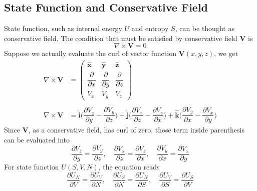 \documentclass[../../../main.tex]{subfiles}
\begin{document}
\subsection{State Function and Conservative Field}
State function, such as internal energy \(U \) and entropy \(S \), can be thought as conservative field. The condition that must be satisfied by conservative field $\mathbf{V}$ is
\begin{equation*}
    \nabla\times \mathbf{V}=0
\end{equation*}
Suppose we actually evaluate the curl of vector function $\mathbf{V}(x,y,z)$, we get
\begin{align*}
    \nabla\times \mathbf{V} & =\begin{pmatrix}
                                   \mathbf{\hat{x}}              & \mathbf{\hat{y}}              & \mathbf{\hat{z}}              \\
                                   \dfrac{\partial }{\partial x} & \dfrac{\partial }{\partial y} & \dfrac{\partial }{\partial z} \\
                                   V_x                           & V_y                           & V_z
                               \end{pmatrix} \\
    \\
    \nabla\times \mathbf{V} & =
    \mathbf{\hat{i}} \biggl(\dfrac{\partial V_z}{\partial y} -\dfrac{\partial V_y}{\partial z}\biggr)+
    \mathbf{\hat{j}} \biggl(\dfrac{\partial V_x}{\partial z}-\dfrac{\partial V_z}{\partial x} \biggr) +
    \mathbf{\hat{k}}\biggl( \dfrac{\partial V_y}{\partial x}-\dfrac{\partial V_x}{\partial y}\biggr)
\end{align*}
Since \textbf{V}, as a conservative field, has curl of zero, those term inside parenthesis can be evaluated into
\begin{equation*}
    \dfrac{\partial V_z}{\partial y} =\dfrac{\partial V_y}{\partial z},\quad
    \dfrac{\partial V_x}{\partial z}=\dfrac{\partial V_z}{\partial x},\quad
    \dfrac{\partial V_y}{\partial x}=\dfrac{\partial V_x}{\partial y}
\end{equation*}
For state function \(U(S,V,N)\), the equation reads
\begin{equation*}
    \dfrac{\partial U_N}{\partial V} =\dfrac{\partial U_V}{\partial N},\quad
    \dfrac{\partial U_S}{\partial N}=\dfrac{\partial U_N}{\partial S},\quad
    \dfrac{\partial U_V}{\partial S}=\dfrac{\partial U_S}{\partial V}
\end{equation*}
\end{document}
